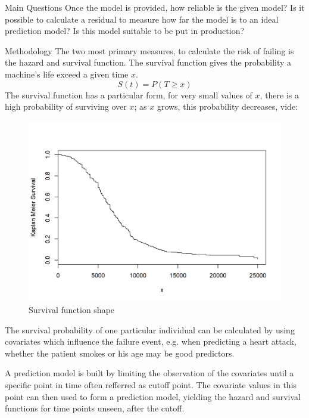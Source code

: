 \documentclass[t]{beamer}
\begin{document}
\begin{frame}[label={sec:orgc2b2963}]{}
\begin{columns}
\begin{column}{0.3\columnwidth}
\begin{block}{Main Questions}
Once the model is provided, how reliable is the given model? Is it possible to calculate a residual to measure how far the model is to an
ideal prediction model? Is this model suitable to be put in production?
\end{block}
\begin{block}{Methodology}
The two most primary measures, to calculate the risk of failing is the hazard and survival function.
The survival function gives the probability a machine's life exceed a given time \(x\).
$$ S(t) = P(T\ge x)$$
The survival function has a particular form, for very small values of \(x\), there is a high
probability of surviving over \(x\); as \(x\) grows, this probability decreases, vide:
\begin{figure}[htbp]
\centering
\includegraphics[width=.9\linewidth]{./Logos/survival.png}
\caption{\label{fig:org1ff06fd}
Survival function shape}
\end{figure}

The survival probability of one particular individual can be calculated by using covariates
which influence the failure event, e.g. when predicting a heart attack, whether the patient smokes or his age may be good predictors. 

A prediction model is built by limiting the observation of the covariates until a specific point 
in time often refferred as \alert{cutoff} point. The covariate values in this point
can then used to form a prediction model, yielding the hazard and survival functions
for time points unseen, after the cutoff.

\begin{figure}[H]
    \begin{center}
\end{center}
\end{figure}
\end{block}
\end{column}
\end{columns}
\end{frame}
\end{document}

